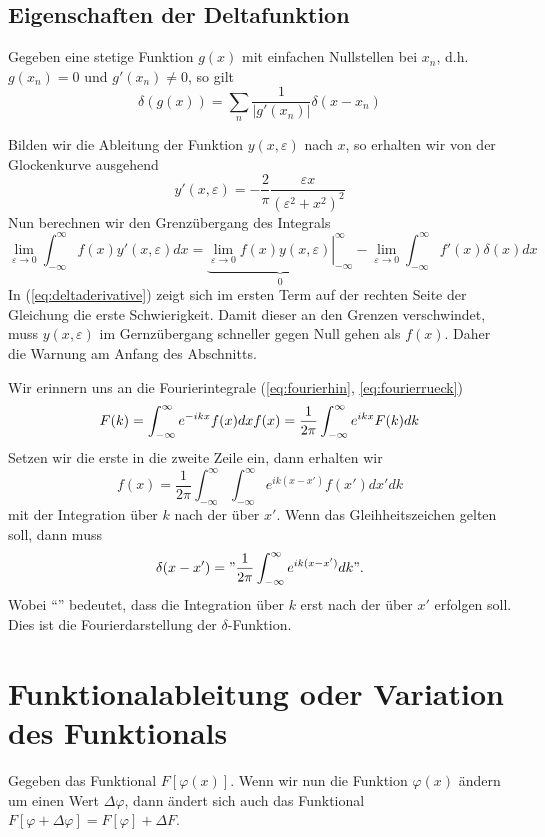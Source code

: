 \subsection{Eigenschaften der Deltafunktion}
Gegeben eine stetige Funktion $g(x)$ mit einfachen Nullstellen bei $x_n$, d.h.
$g(x_n)=0$ und $g'(x_n)\ne 0$, so gilt
\[\delta(g(x))=\sum\limits_n\frac{1}{|g'(x_n)|}\delta(x-x_n)\]

Bilden wir die Ableitung der Funktion $y(x,\varepsilon)$ nach $x$, so erhalten
wir von der Glockenkurve ausgehend 
\[y'(x,\varepsilon)=-\frac{2}{\pi}\frac{\varepsilon x}{(\varepsilon^2+x^2)^2}\]
Nun berechnen wir den Grenzübergang des Integrals
\begin{equation}\label{eq:deltaderivative}
\lim_{\varepsilon\rightarrow 0}\int_{-\infty}^{\infty}f(x)y'(x,\varepsilon)dx=
\underbrace{\left.\lim_{\varepsilon\rightarrow 0}f(x)y(x,\varepsilon)\right|_{-\infty}^{\infty}}_{0}
-\lim_{\varepsilon\rightarrow 0}\int_{-\infty}^{\infty}f'(x)\delta(x)dx
\end{equation}
In (\ref{eq:deltaderivative}) zeigt sich im ersten Term auf der rechten Seite
der Gleichung die erste Schwierigkeit. Damit dieser an den Grenzen
verschwindet, muss $y(x,\varepsilon)$ im Gernzübergang schneller gegen Null
gehen als $f(x)$. Daher die Warnung am Anfang des Abschnitts.

Wir erinnern uns an die Fourierintegrale (\ref{eq:fourierhin}, \ref{eq:fourierrueck})
\[
F(k)=\int_{-\infty}^{\infty}e^{-ikx}f(x)dx\\
f(x)=\frac{1}{2\pi}\int_{-\infty}^{\infty}e^{ikx}F(k)dk
\]
Setzen wir die erste in die zweite Zeile ein, dann erhalten wir
\[f(x)=\frac{1}{2\pi}\int_{-\infty}^{\infty}\int_{-\infty}^{\infty}e^{ik(x-x')}f(x')dx'dk\]
mit der Integration über $k$ nach der über $x'$. Wenn das Gleihheitszeichen
gelten soll, dann muss
\[\delta(x-x')="\frac{1}{2\pi}\int_{-\infty}^{\infty}e^{ik(x-x')}dk".\]
Wobei ``'' bedeutet, dass die Integration über $k$ erst nach der über $x'$
erfolgen soll. Dies ist die Fourierdarstellung der $\delta$-Funktion.
%
\section{Funktionalableitung oder Variation des Funktionals}\label{sec:Funktionalableitung}
Gegeben das Funktional $F[\varphi(x)]$. Wenn wir nun die Funktion $\varphi(x)$
ändern um einen Wert $\Delta\varphi$, dann ändert
sich auch das Funktional
$F[\varphi+\Delta\varphi]=F[\varphi]+\Delta F$. 


